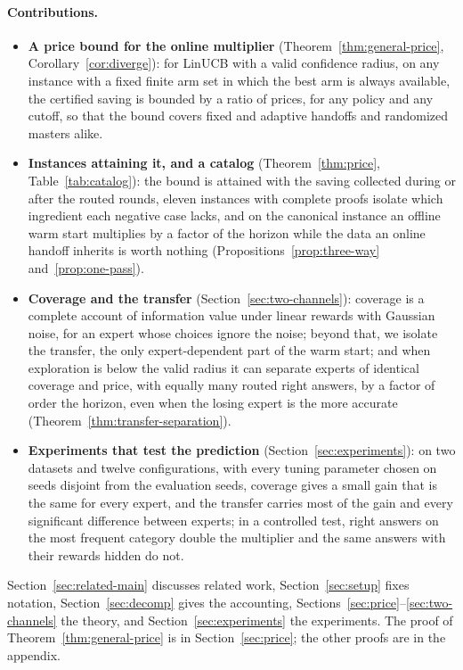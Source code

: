 \documentclass{article}
\theoremstyle{definition}
\theoremstyle{remark}
\theoremstyle{remark}
\begin{document}
\paragraph{Contributions.}
\begin{itemize}[itemsep=1pt, topsep=1pt, leftmargin=*]
\item \textbf{A price bound for the online multiplier}
(Theorem~\ref{thm:general-price}, Corollary~\ref{cor:diverge}): for LinUCB
with a valid confidence radius, on any instance with a fixed finite arm set in
which the best arm is always available, the certified saving is bounded by a
ratio of prices, for any policy and any cutoff, so that the bound covers fixed
and adaptive handoffs and randomized masters alike.
\item \textbf{Instances attaining it, and a catalog}
(Theorem~\ref{thm:price}, Table~\ref{tab:catalog}): the bound is attained
with the saving collected during or after the routed rounds, eleven instances
with complete proofs isolate which ingredient each negative case lacks, and
on the canonical instance an offline warm start multiplies by a factor of the
horizon while the data an online handoff inherits is worth nothing
(Propositions~\ref{prop:three-way} and~\ref{prop:one-pass}).
\item \textbf{Coverage and the transfer} (Section~\ref{sec:two-channels}):
coverage is a complete account of information value under linear rewards
with Gaussian noise, for an expert whose choices ignore the noise; beyond
that, we isolate the transfer, the only expert-dependent part of the warm
start; and when exploration is below the valid radius it can separate experts
of identical coverage and price, with equally many routed right answers, by a
factor of order the horizon, even when the losing expert is the more accurate
(Theorem~\ref{thm:transfer-separation}).
\item \textbf{Experiments that test the prediction}
(Section~\ref{sec:experiments}): on two datasets and twelve configurations,
with every tuning parameter chosen on seeds disjoint from the evaluation
seeds, coverage gives a small gain that is the same for every expert, and the
transfer carries most of the gain and every significant difference between
experts; in a controlled test, right answers on the most frequent category
double the multiplier and the same answers with their rewards hidden do not.
\end{itemize}
Section~\ref{sec:related-main} discusses related work,
Section~\ref{sec:setup} fixes notation, Section~\ref{sec:decomp} gives the
accounting, Sections~\ref{sec:price}--\ref{sec:two-channels} the theory, and
Section~\ref{sec:experiments} the experiments. The proof of
Theorem~\ref{thm:general-price} is in Section~\ref{sec:price}; the other proofs
are in the appendix.
\end{document}
